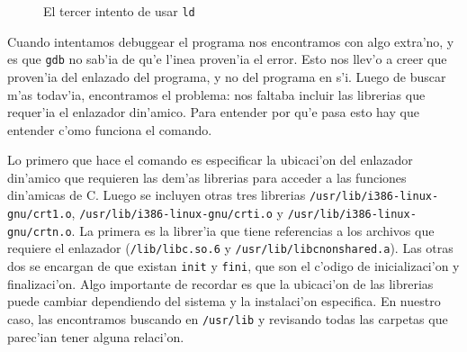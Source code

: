 \documentclass[11pt]{article}
\begin{document}
		\begin{figure}[H]
			\centering
			 \par
			
			\caption{El tercer intento de usar \texttt{ld}}
			\label{fig:third-ld-attempt}
		\end{figure}
		
		Cuando intentamos debuggear el programa nos encontramos con algo extra'no, y es que \texttt{gdb} no sab'ia de qu'e l'inea proven'ia el error. Esto nos llev'o a creer que proven'ia del enlazado del programa, y no del programa en s'i. Luego de buscar m'as todav'ia, encontramos el problema: nos faltaba incluir las librerias que requer'ia el enlazador din'amico. Para entender por qu'e pasa esto hay que entender c'omo funciona el comando.
		
		Lo primero que hace el comando es especificar la ubicaci'on del enlazador din'amico que requieren las dem'as librerias para acceder a las funciones din'amicas de C. Luego se incluyen otras tres librerias \texttt{/usr/lib/i386-linux-gnu/crt1.o}, \texttt{/usr/lib/i386-linux-gnu/crti.o} y \texttt{/usr/lib/i386-linux-gnu/crtn.o}. La primera es la librer'ia que tiene referencias a los archivos que requiere el enlazador (\texttt{/lib/libc.so.6} y \texttt{/usr/lib/libc\textunderscore\/nonshared.a}). Las otras dos se encargan de que existan \texttt{\textunderscore\/init} y \texttt{\textunderscore\/fini}, que son el c'odigo de inicializaci'on y finalizaci'on. Algo importante de recordar es que la ubicaci'on de las librerias puede cambiar dependiendo del sistema y la instalaci'on especifica. En nuestro caso, las encontramos buscando en \texttt{/usr/lib} y revisando todas las carpetas que parec'ian tener alguna relaci'on.
	
\end{document}
